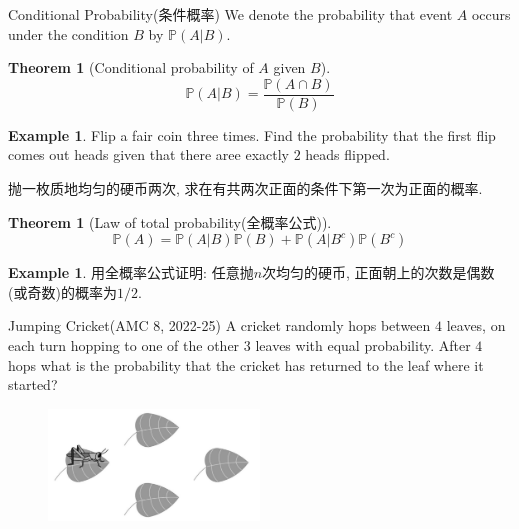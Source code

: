 \documentclass{beamer}
\theoremstyle{definition}
\newtheorem{theo}[defn]{Theorem}
\newtheorem{exam}[defn]{Example}
\newcommand{\bb}[1]{\mathbb{#1}}
\begin{document}
\begin{frame}{Conditional Probability(条件概率)}
    We denote the probability that event $A$ occurs under the condition $B$ by $\mathbb{P}(A|B)$.

    \begin{theo}[Conditional probability of $A$ given $B$]
        \begin{equation*}
            \mathbb{P}(A|B)=\frac{\bb{P}(A\cap B)}{\bb{P}(B)}
        \end{equation*}
    \end{theo}

    \begin{exam}
        Flip a fair coin three times. Find the probability that the first flip comes out heads given that there aree exactly $2$ heads flipped.

        抛一枚质地均匀的硬币两次, 求在有共两次正面的条件下第一次为正面的概率.
    \end{exam}
\end{frame}
\begin{frame}
\begin{theo}[Law of total probability(全概率公式)]
    \begin{equation*}
        \bb{P}(A)=\bb{P}(A|B)\bb{P}(B)+\bb{P}(A|B^c)\bb{P}(B^c)
    \end{equation*}
\end{theo}
\begin{exam} 
    用全概率公式证明: 任意抛$n$次均匀的硬币, 正面朝上的次数是偶数(或奇数)的概率为$1/2$.
\end{exam}
\end{frame}
\begin{frame}{Jumping Cricket(AMC 8, 2022-25)}
    A cricket randomly hops between $4$ leaves,
    on each turn hopping to one of the other $3$ leaves with equal probability. After $4$ hops what is the probability that the cricket has returned to the leaf where it started?
    \begin{figure}
        \centering
        \includegraphics[width=0.5\textwidth]{AMC8-2022-25.jpg}
    \end{figure}
\end{frame}
\end{document}
